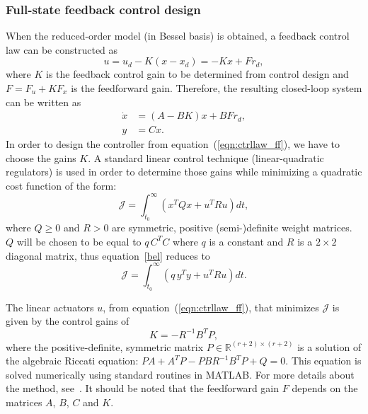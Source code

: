 \documentclass[12pt]{iopart}
\begin{document}
\subsubsection{Full-state feedback control design} 

When the reduced-order model (in Bessel basis) is obtained, a feedback control law can be constructed as
\begin{equation}
   u = u_{d} - K(x - x_{d}) = - Kx + Fr_{d},
   \label{eqn:ctrllaw_ff}
\end{equation}
where $K$ is the feedback control gain to be determined from control design and $F = F_u + K F_x$ is the feedforward gain.  Therefore, the resulting closed-loop system can be written as
\begin{align}
      \dot{x} &= (A-BK) x + BF r_{d}, \\
      y &= C x.
\end{align}
In order to design the controller from equation~(\ref{eqn:ctrllaw_ff}), we have to choose the gains $K$.
A  standard linear control technique (linear-quadratic regulators) is used in order to determine those gains while minimizing a quadratic cost function of the form:
\begin{equation}
 \mathcal{J} = \int_{t_0}^\infty \left( x^T Q x + u^T R u \right) dt,
 \label{bel}
\end{equation}
where $Q\ge 0$ and $R>0$ are symmetric, positive (semi-)definite weight matrices. $Q$ will be chosen to be equal to $q \, C^{T} C$ where $q$ is a constant and $R$ is a $2 \times 2$ diagonal matrix, thus equation~\ref{bel} reduces to
\begin{equation}
   \mathcal{J} = \int_{t_0}^\infty \left( q \, y^T y + u^T R u \right) dt.
\end{equation}

 
The linear actuators $u$, from equation~(\ref{eqn:ctrllaw_ff}), that minimizes $\mathcal{J}$ is given by the control gains of
\begin{equation}
   K  = - R^{-1} B^T P,
\end{equation}
where the positive-definite, symmetric matrix $P \in \mathbb{R}^{(r+2) \times (r+2)}$ is a solution of the algebraic Riccati equation: $P {A} + {A}^T P - P {B} R^{-1} B^T P + Q = 0$.  This equation is solved numerically using standard routines in MATLAB. For more details about the method, see~\cite{SandP, AandM, Stengel}.
It should be noted that the feedforward gain $F$  depends on the matrices $A$, $B$, $C$ and $K$.
\end{document}
